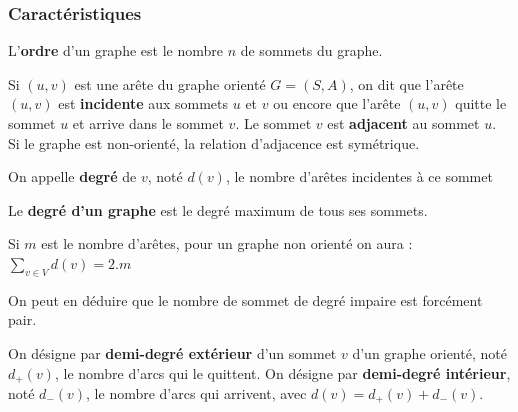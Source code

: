 \begin{frame}[fragile]
\frametitle{Caractéristiques}

L'\textbf{ordre} d'un graphe est le nombre $n$ de sommets du graphe.

\medskip
Si $(u,v)$ est une arête du graphe orienté $G=(S,A)$, on dit que l'arête $(u,v)$ est \textbf{incidente} aux sommets $u$ et $v$ ou encore que l'arête $(u,v)$ quitte le sommet $u$ et arrive dans le sommet $v$. Le sommet $v$ est \textbf{adjacent} au sommet $u$. Si le graphe est non-orienté, la relation d'adjacence est symétrique.

\begin{defi}
On appelle \textbf{degré} de $v$, noté $d(v)$, le nombre d'arêtes incidentes à ce sommet

Le \textbf{degré d'un graphe} est le degré maximum de tous ses sommets.
\end{defi}

Si $m$ est le nombre d'arêtes, pour un graphe non orienté on aura :
$\sum\limits_{v \in V} d(v) = 2.m$

On peut en déduire que le nombre de sommet de degré impaire est forcément pair.

On désigne par \textbf{demi-degré extérieur} d'un sommet $v$ d'un graphe orienté, noté $d_+(v)$, le nombre d'arcs qui le quittent. On désigne par \textbf{demi-degré intérieur}, noté $d_-(v)$, le nombre d'arcs qui arrivent, avec $d(v) = d_+(v) + d_-(v)$.
\end{frame}

